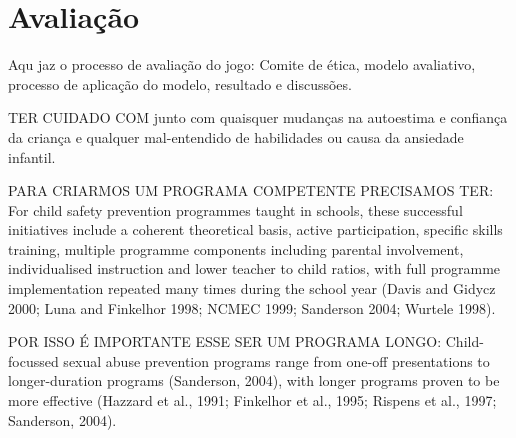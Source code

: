 \chapter{Avaliação}\label{ch:Avaliacao}

Aqu jaz o processo de avaliação do jogo:
Comite de ética, modelo avaliativo, processo de aplicação do modelo, resultado e discussões. 


TER CUIDADO COM junto com quaisquer mudanças na autoestima e confiança da criança e qualquer mal-entendido de habilidades ou causa da ansiedade infantil.


PARA CRIARMOS UM PROGRAMA COMPETENTE PRECISAMOS TER: For child safety prevention programmes taught in schools, these successful initiatives include a coherent theoretical basis, active participation, specific skills training, multiple programme components including parental involvement, individualised instruction and lower teacher to child ratios, with full programme implementation repeated many times during the school year (Davis and Gidycz 2000; Luna and Finkelhor 1998; NCMEC 1999; Sanderson 2004; Wurtele 1998).

POR ISSO É IMPORTANTE ESSE SER UM PROGRAMA LONGO: Child-focussed sexual abuse prevention programs range from one-off presentations to longer-duration programs (Sanderson, 2004), with longer programs proven to be more effective (Hazzard et al., 1991; Finkelhor et al., 1995; Rispens et al., 1997; Sanderson, 2004). %







